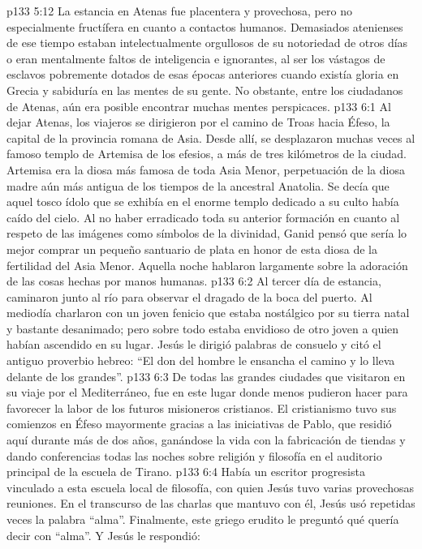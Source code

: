 \vs p133 5:12 La estancia en Atenas fue placentera y provechosa, pero no especialmente fructífera en cuanto a contactos humanos. Demasiados atenienses de ese tiempo estaban intelectualmente orgullosos de su notoriedad de otros días o eran mentalmente faltos de inteligencia e ignorantes, al ser los vástagos de esclavos pobremente dotados de esas épocas anteriores cuando existía gloria en Grecia y sabiduría en las mentes de su gente. No obstante, entre los ciudadanos de Atenas, aún era posible encontrar muchas mentes perspicaces.
\vs p133 6:1 Al dejar Atenas, los viajeros se dirigieron por el camino de Troas hacia Éfeso, la capital de la provincia romana de Asia. Desde allí, se desplazaron muchas veces al famoso templo de Artemisa de los efesios, a más de tres kilómetros de la ciudad. Artemisa era la diosa más famosa de toda Asia Menor, perpetuación de la diosa madre aún más antigua de los tiempos de la ancestral Anatolia. Se decía que aquel tosco ídolo que se exhibía en el enorme templo dedicado a su culto había caído del cielo. Al no haber erradicado toda su anterior formación en cuanto al respeto de las imágenes como símbolos de la divinidad, Ganid pensó que sería lo mejor comprar un pequeño santuario de plata en honor de esta diosa de la fertilidad del Asia Menor. Aquella noche hablaron largamente sobre la adoración de las cosas hechas por manos humanas.
\vs p133 6:2 Al tercer día de estancia, caminaron junto al río para observar el dragado de la boca del puerto. Al mediodía charlaron con un joven fenicio que estaba nostálgico por su tierra natal y bastante desanimado; pero sobre todo estaba envidioso de otro joven a quien habían ascendido en su lugar. Jesús le dirigió palabras de consuelo y citó el antiguo proverbio hebreo: “El don del hombre le ensancha el camino y lo lleva delante de los grandes”.
\vs p133 6:3 De todas las grandes ciudades que visitaron en su viaje por el Mediterráneo, fue en este lugar donde menos pudieron hacer para favorecer la labor de los futuros misioneros cristianos. El cristianismo tuvo sus comienzos en Éfeso mayormente gracias a las iniciativas de Pablo, que residió aquí durante más de dos años, ganándose la vida con la fabricación de tiendas y dando conferencias todas las noches sobre religión y filosofía en el auditorio principal de la escuela de Tirano.
\vs p133 6:4 Había un escritor progresista vinculado a esta escuela local de filosofía, con quien Jesús tuvo varias provechosas reuniones. En el transcurso de las charlas que mantuvo con él, Jesús usó repetidas veces la palabra “alma”. Finalmente, este griego erudito le preguntó qué quería decir con “alma”. Y Jesús le respondió:
